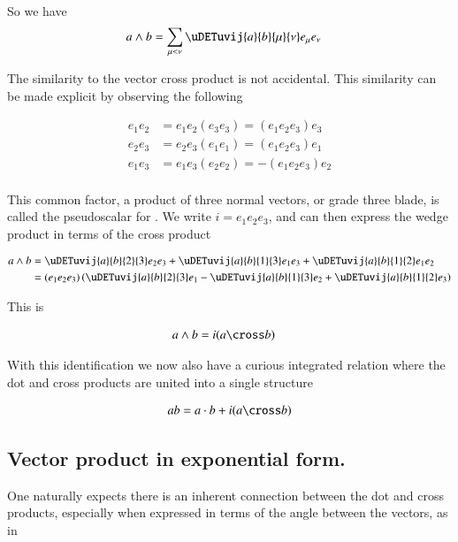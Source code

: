 So we have
\begin{align}
a \wedge b
&= \sum_{\mu < \nu} \uDETuvij{a}{b}{\mu}{\nu} e_\mu e_\nu 
\end{align}

The similarity to the  vector cross product is not accidental.  This similarity can be made explicit by observing the following

\begin{align*}
e_1 e_2 &= e_1 e_2 (e_3 e_3) = (e_1 e_2 e_3) e_3 \\
e_2 e_3 &= e_2 e_3 (e_1 e_1) = (e_1 e_2 e_3) e_1 \\
e_1 e_3 &= e_1 e_3 (e_2 e_2) = -(e_1 e_2 e_3) e_2 \\
\end{align*}

This common factor, a product of three normal vectors, or grade three blade, is called the pseudoscalar for .  We write
$i = e_1 e_2 e_3$, and can then express the  wedge product in terms of the cross product

\begin{align*}
a \wedge b
&= 
\uDETuvij{a}{b}{2}{3} e_2 e_3 
+\uDETuvij{a}{b}{1}{3} e_1 e_3 
+\uDETuvij{a}{b}{1}{2} e_1 e_2  \\
&= 
(e_1 e_2 e_3) \left( \uDETuvij{a}{b}{2}{3} e_1 
-\uDETuvij{a}{b}{1}{3} e_2 
+\uDETuvij{a}{b}{1}{2} e_3 \right) \\
\end{align*}

This is

\begin{align}\label{eqn:wedgeAsCross}
a \wedge b &= i (a \cross b)
\end{align}

With this identification we now also have a curious integrated relation where the dot and cross products are united into
a single structure

\begin{align}\label{eqn:scalarPlusIcross}
a b = a \cdot b + i (a \cross b)
\end{align}

\subsection{ Vector product in exponential form. }

One naturally expects there is an inherent connection between the dot and cross products, especially when expressed in terms of
the angle between the vectors, as in

